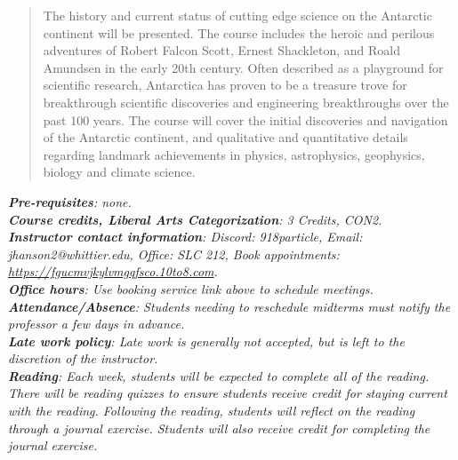 \documentclass[10pt]{article}
\begin{document}
\maketitle

\begin{abstract}
The history and current status of cutting edge science on the Antarctic continent will be presented. The course includes the heroic and perilous adventures of Robert Falcon Scott, Ernest Shackleton, and Roald Amundsen in the early 20th century. Often described as a playground for scientific research, Antarctica has proven to be a treasure trove for breakthrough scientific discoveries and engineering breakthroughs over the past 100 years. The course will cover the initial discoveries and navigation of the Antarctic continent, and qualitative and quantitative details regarding landmark achievements in physics, astrophysics, geophysics, biology and climate science.
\end{abstract}
\noindent
\textit{\textbf{Pre-requisites}: none.} \\
\textit{\textbf{Course credits, Liberal Arts Categorization}: 3 Credits, CON2.} \\
\textit{\textbf{Instructor contact information}: Discord: 918particle, Email: jhanson2@whittier.edu, Office: SLC 212, Book appointments: \url{https://fgucmvjkylvmgqfsco.10to8.com}.} \\
\textit{\textbf{Office hours}: Use booking service link above to schedule meetings.} \\
\textit{\textbf{Attendance/Absence}: Students needing to reschedule midterms must notify the professor a few days in advance.} \\ 
\textit{\textbf{Late work policy}: Late work is generally not accepted, but is left to the discretion of the instructor.} \\
\textit{\textbf{Reading}: Each week, students will be expected to complete all of the reading.  There will be reading quizzes to ensure students receive credit for staying current with the reading.  Following the reading, students will reflect on the reading through a journal exercise.  Students will also receive credit for completing the journal exercise.}
\end{document}
